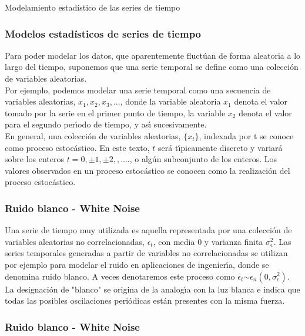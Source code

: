 \documentclass[xcolor=(list of options)]{beamer}
\begin{document}
\begin{section}{Modelamiento estad\'istico de las series de tiempo}
\begin{frame}
\frametitle{Modelos estad\'isticos de series de tiempo}
Para poder modelar los datos, que aparentemente fluct\'uan de forma aleatoria a lo largo del tiempo, suponemos que una serie temporal se define como una colecci\'on de variables aleatorias. 
\\
Por ejemplo, podemos modelar  una serie temporal como una secuencia de variables aleatorias, $x_1, x_2, x_3,...$, donde la variable aleatoria $x_1$ denota el valor tomado por la serie en el primer punto de tiempo, la variable $x_2$  denota el valor para el segundo per\'\i{}odo de tiempo, y as\'\i{} sucesivamente. 
\\
En general, una colecci\'on de variables aleatorias,  $\{x_t\}$, indexada por t se conoce como proceso estoc\'astico. En este texto, $t$ ser\'a t\'\i{}picamente discreto y variar\'a sobre los enteros $t = 0, \pm1, \pm2,,.... $, o alg\'un subconjunto de los enteros. Los valores observados en un proceso estoc\'astico se conocen como la realizaci\'on del proceso estoc\'astico.

\end{frame}

\begin{frame}
\frametitle{Ruido blanco - White Noise}

Una serie de tiempo muy utilizada es aquella representada por una colecci\'on de variables aleatorias no correlacionadas, $\epsilon_t$, con media $0$ y varianza finita $\sigma^2_\epsilon$. Las series temporales generadas a partir de variables no correlacionadas se utilizan por ejemplo para modelar el ruido en aplicaciones de ingenier\'\i{}a, donde se denomina ruido blanco. A veces denotaremos este proceso como $\epsilon_t$$\sim$$\epsilon_n (0, \sigma^2_\epsilon)$. La designaci\'on de "blanco" se origina de la analog\'\i{}a con la luz blanca e indica que todas las posibles oscilaciones peri\'odicas est\'an presentes con la misma fuerza.

\end{frame}
\begin{frame}
\frametitle{Ruido blanco - White Noise}


\end{frame}
\end{section}
\end{document}
